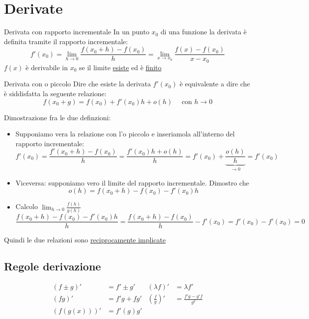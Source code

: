 \section{Derivate}
\begin{definizione}{Derivata con rapporto incrementale
	}
	In un punto $x_0$ di una funzione la derivata è definita tramite il rapporto incrementale:
	\[
		f' \left( x_0 \right) = \lim_{h \to 0} \frac{f\left( x_0 + h \right) - f\left( x_0 \right) }{h} = \lim_{x \to x_0} \frac{f\left( x \right) - f\left( x_0 \right)}{x-x_0}
	\]
	$f\left( x \right) $ è derivabile in $x_0$ se il limite \underline{esiste} ed è \underline{finito}

\end{definizione}

\begin{definizione}{Derivata con o piccolo }
	Dire che esiste la derivata $f' \left( x_0 \right) $ è equivalente a dire che è siddisfatta la seguente relazione:
	\[
		f\left( x_0 + g \right) = f\left( x_0 \right) + f'\left( x_0 \right) h + o\left( h \right) \quad \text{ con } h \to 0
	\]

\end{definizione}

Dimostrazione fra le due definzioni:
\begin{itemize}
	\item Supponiamo vera la relazione con l'o piccolo e inseriamola all'interno del rapporto incrementale:
	      \[
		      f'\left( x_0 \right)  = \frac{f'\left( x_0 +h\right) - f\left( x_0 \right) }{h} = \frac{f'\left( x_0 \right) h + o\left( h \right) }{h} = f'\left( x_0 \right) + \underbrace{\frac{o\left( h \right) }{h}}_{ \to 0 } = f'\left( x_0 \right)
	      \]
	\item Viceversa: supponiamo vero il limite del rapporto incrementale. Dimostro che
	      \[
		      o\left( h \right)  = f\left( x_0 + h \right) - f\left( x_0 \right) - f'\left( x_0 \right) h
	      \]
	\item Calcolo $\lim_{h \to 0} \frac{f\left( h \right) }{g\left( h \right) }$
	      \[
		      \frac{f\left( x_0+h \right) - f\left( x_0 \right) - f'\left( x_0 \right) h}{h} = \frac{f\left( x_0 +h \right) - f\left( x_0 \right)}{h} - f'\left( x_0 \right) = f'\left( x_0 \right) - f' \left( x_0 \right) =0
	      \]
\end{itemize}
Quindi le due relazioni sono \underline{reciprocamente implicate}
\subsection{Regole derivazione}
\begin{align*}
	\left( f \pm g \right) '                              & = f' \pm g'              & \left( \lambda f \right) '   & =  \lambda f'           \\
	\left( fg \right) '                                   & =  f'g + fg'             & \left( \frac{f}{g} \right) ' & =  \frac{f'g- g'f}{g^2} \\
	\left( f\left( g\left( x \right)   \right)  \right) ' & =  f'\left( g \right) g'
\end{align*}
